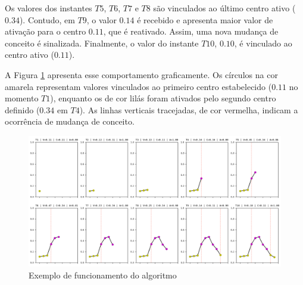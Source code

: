 \documentclass[msc, classic, a4paper]{ufbathesis}
\begin{document}
Os valores dos instantes $T5$, $T6$, $T7$ e $T8$ são vinculados ao último centro ativo ($0.34$).
Contudo, em $T9$, o valor $0.14$ é recebido e apresenta maior valor de ativação para o centro $0.11$, que é reativado.
Assim, uma nova mudança de conceito é sinalizada.
Finalmente, o valor do instante $T10$, $0.10$, é vinculado ao centro ativo ($0.11$).

A Figura \ref{fig:funcionamento_algoritmo} apresenta esse comportamento graficamente.
Os círculos na cor amarela representam valores vinculados ao primeiro centro estabelecido ($0.11$ no momento $T1$),
enquanto os de cor lilás foram ativados pelo segundo centro definido ($0.34$ em $T4$).
As linhas verticais tracejadas, de cor vermelha, indicam a ocorrência de mudança de conceito.

\begin{figure}[H]
\begin{center}
    \includegraphics[width=\textwidth]{imagens/funcionamento_algoritmo.png}
    \caption{Exemplo de funcionamento do algoritmo}
    \label{fig:funcionamento_algoritmo}
\end{center}
\end{figure}



\end{document}
